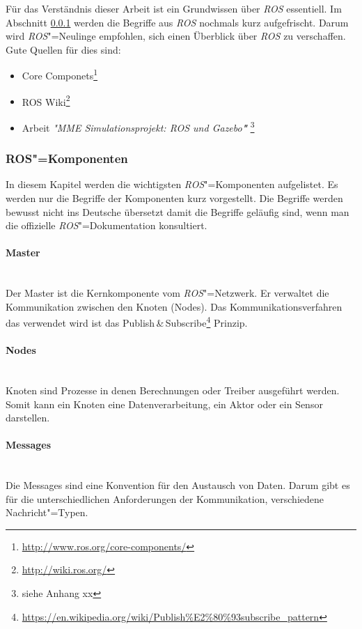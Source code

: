 Für das Verständnis dieser Arbeit ist ein Grundwissen über \textit{ROS} essentiell.
Im Abschnitt \ref{chap:ros-komponenten} werden die Begriffe aus \textit{ROS} nochmals kurz aufgefrischt.
Darum wird \textit{ROS}"=Neulinge empfohlen, sich einen Überblick über \textit{ROS} zu verschaffen.
Gute Quellen für dies sind:
\begin{itemize}
\item Core Componets\footnote{\url{http://www.ros.org/core-components/}} 
\item ROS Wiki\footnote{\url{http://wiki.ros.org/}}
\item Arbeit \textit{\textsc{"}MME Simulationsprojekt: ROS und Gazebo\textbf{"}} \footnote{siehe Anhang xx} %
\end{itemize}

\subsubsection{ROS"=Komponenten}
\label{chap:ros-komponenten}
In diesem Kapitel werden die wichtigsten \textit{ROS}"=Komponenten aufgelistet.
Es werden nur die Begriffe der Komponenten kurz vorgestellt.
Die Begriffe werden bewusst nicht ins Deutsche übersetzt damit die Begriffe geläufig sind, wenn man die offizielle \textit{ROS}"=Dokumentation konsultiert.

\paragraph*{Master} \mbox{}\\
Der Master ist die Kernkomponente vom \textit{ROS}"=Netzwerk.
Er verwaltet die Kommunikation zwischen den Knoten (Nodes).
Das Kommunikationsverfahren das verwendet wird ist das Publish\,\&\,Subscribe\footnote{\url{https://en.wikipedia.org/wiki/Publish\%E2\%80\%93subscribe_pattern}}  Prinzip. 

\paragraph*{Nodes} \mbox{}\\
Knoten sind Prozesse in denen Berechnungen oder Treiber ausgeführt werden. 
Somit kann ein Knoten eine Datenverarbeitung, ein Aktor oder ein Sensor darstellen.  

\paragraph*{Messages} \mbox{}\\
Die Messages sind eine Konvention für den Austausch von Daten.
Darum gibt es für die unterschiedlichen Anforderungen der Kommunikation, verschiedene Nachricht"=Typen.

